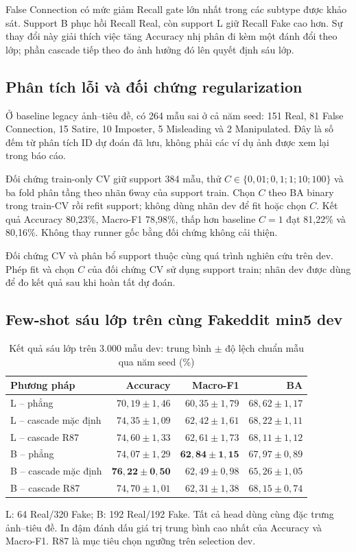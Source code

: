 \documentclass[12pt,a4paper]{article}
\newcommand{\BodySize}{13}
\newcommand{\BodyLeading}{15.6}
\newcommand{\BodyFont}{\fontsize{\BodySize}{\BodyLeading}\selectfont}
\numberwithin{figure}{section}
\numberwithin{table}{section}
\numberwithin{equation}{section}
\begin{document}
False Connection có mức giảm Recall gate lớn nhất trong các subtype được khảo sát. Support B phục hồi Recall Real, còn support L giữ Recall Fake cao hơn. Sự thay đổi này giải thích việc tăng Accuracy nhị phân đi kèm một đánh đổi theo lớp; phần cascade tiếp theo đo ảnh hưởng đó lên quyết định sáu lớp.

\subsection{Phân tích lỗi và đối chứng regularization}

Ở baseline legacy ảnh--tiêu đề, có 264 mẫu sai ở cả năm seed: 151 Real, 81 False Connection, 15
Satire, 10 Imposter, 5 Misleading và 2 Manipulated. Đây là số đếm từ phân tích ID dự đoán đã lưu,
không phải các ví dụ ảnh được xem lại trong báo cáo.

Đối chứng train-only CV giữ support 384 mẫu, thử $C\in\{0{,}01;0{,}1;1;10;100\}$ và ba fold phân
tầng theo nhãn 6way của support train. Chọn $C$ theo BA binary trong train-CV rồi refit support;
không dùng nhãn dev để fit hoặc chọn $C$. Kết quả Accuracy 80,23\%, Macro-F1 78,98\%, thấp hơn
baseline $C=1$ đạt 81,22\% và 80,16\%. Không thay runner gốc bằng đối chứng không cải thiện.

Đối chứng CV và phân bổ support thuộc cùng quá trình nghiên cứu trên dev. Phép fit và chọn $C$ của đối chứng CV sử dụng support train; nhãn dev được dùng để đo kết quả sau khi hoàn tất dự đoán.

\subsection{Few-shot sáu lớp trên cùng Fakeddit min5 dev}
\begin{table}[H]\centering\BodyFont
\caption{Kết quả sáu lớp trên 3.000 mẫu dev: trung bình $\pm$ độ lệch chuẩn mẫu qua năm seed (\%)}
\begin{tabularx}{\linewidth}{@{}Lrrr@{}}\toprule
Phương pháp & Accuracy & Macro-F1 & BA\\\midrule
L -- phẳng & $70,19\pm1,46$ & $60,35\pm1,79$ & $68,62\pm1,17$\\
L -- cascade mặc định & $74,35\pm1,09$ & $62,42\pm1,61$ & $68,22\pm1,11$\\
L -- cascade R87 & $74,60\pm1,33$ & $62,61\pm1,73$ & $68,11\pm1,12$\\
B -- phẳng & $74,07\pm1,29$ & $\mathbf{62,84\pm1,15}$ & $67,97\pm0,89$\\
B -- cascade mặc định & $\mathbf{76,22\pm0,50}$ & $62,49\pm0,98$ & $65,26\pm1,05$\\
B -- cascade R87 & $74,70\pm1,01$ & $62,31\pm1,38$ & $68,15\pm0,74$\\\bottomrule
\end{tabularx}\label{tab:cascade-main}
\par\smallskip\begin{minipage}{\linewidth}\BodyFont L: 64 Real/320 Fake; B: 192 Real/192 Fake. Tất cả head dùng cùng đặc trưng ảnh--tiêu đề. In đậm đánh dấu giá trị trung bình cao nhất của Accuracy và Macro-F1. R87 là mục tiêu chọn ngưỡng trên selection dev.\end{minipage}
\end{table}
\end{document}
